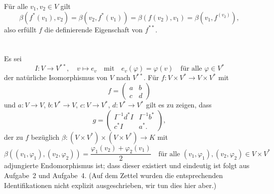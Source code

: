 \documentclass[a4paper,10pt,numbers=noenddot]{scrartcl}
\begin{document}
Für alle $v_1, v_2 \in V$ gilt
\[
    \beta(f^*(v_1), v_2)
  = \beta(v_2, f^*(v_1))
  = \beta(f(v_2), v_1)
  = \beta(v_1, f^(v_2)),
\]
also erfüllt $f$ die definierende Eigenschaft von $f^{**}$.










\section{}


Es sei
\[
  I \colon V \to V^{**},
  \quad
  v \mapsto e_v
  \quad\text{mit}\quad
  e_v(\varphi) = \varphi(v)
  \quad
  \text{für alle $\varphi \in V^*$}
\]
der natürliche Isomorphismus von $V$ nach $V^{**}$.
Für $f \colon V \times V^* \to V \times V^*$ mit
\[
  f
  =
  \begin{pmatrix}
    a & b \\
    c & d
  \end{pmatrix}
\]
und $a \colon V \to V$, $b \colon V^* \to V$, $c \colon V \to V^*$, $d \colon V^* \to V^*$ gilt es zu zeigen, dass
\[
  g
  =
  \begin{pmatrix}
    I^{-1} d^* I  & I^{-1} b^*  \\
    c^* I           & a^*.
  \end{pmatrix},
\]
der zu $f$ bezüglich $\beta \colon (V \times V^*) \times (V \times V^*) \to K$ mit
\[
    \beta((v_1, \varphi_1), (v_2, \varphi_2))
  = \frac{ \varphi_1(v_2) + \varphi_2(v_1) }{2}
  \quad
  \text{für alle $(v_1, \varphi_1), (v_2, \varphi_2) \in V \times V^*$}
\]
adjungierte Endomorphismus ist; dass dieser existiert und eindeutig ist folgt aus Aufgabe~2 und Aufgabe~4.
(Auf dem Zettel wurden die entsprechenden Identifikationen nicht explizit ausgeschrieben, wir tun dies hier aber.)
\end{document}
